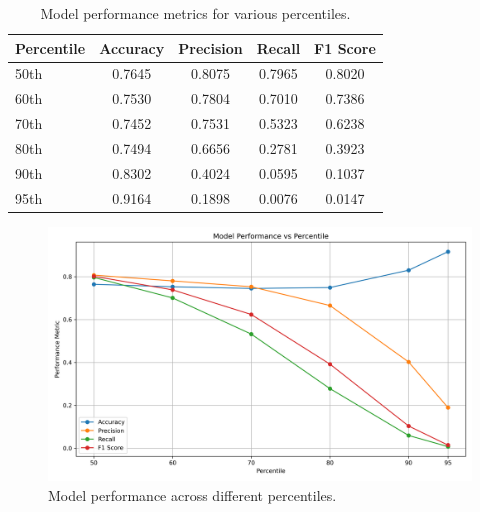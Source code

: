 \documentclass[conference,9pt]{IEEEtran}
\begin{document}
\begin{table}[h]
    \centering
    \caption{Model performance metrics for various percentiles.}
    \label{tab:perc}
    \begin{tabular}{lcccc}
        \toprule
        \textbf{Percentile} & \textbf{Accuracy} & \textbf{Precision} & \textbf{Recall} & \textbf{F1 Score} \\
        \midrule
        50th & 0.7645 & 0.8075 & 0.7965 & 0.8020 \\
        60th & 0.7530 & 0.7804 & 0.7010 & 0.7386 \\
        70th & 0.7452 & 0.7531 & 0.5323 & 0.6238 \\
        80th & 0.7494 & 0.6656 & 0.2781 & 0.3923 \\
        90th & 0.8302 & 0.4024 & 0.0595 & 0.1037 \\
        95th & 0.9164 & 0.1898 & 0.0076 & 0.0147 \\
        \bottomrule
    \end{tabular}
\end{table}

\begin{figure}[h]
    \centering
    \includegraphics[width=\columnwidth]{./performance_vs_percentile.png}
    \caption{Model performance across different percentiles.}
    \label{fig:perc}
\end{figure}
\end{document}
